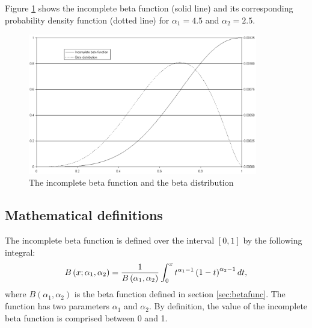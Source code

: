 Figure \ref{fig:incBetaFunction} shows the incomplete beta
function (solid line) and its corresponding probability density
function (dotted line) for $\alpha_1=4.5$ and $\alpha_2=2.5$.
\begin{figure}
\centering\includegraphics[width=10cm]{Figures/IncompleteBetaFunction}
\caption{The incomplete beta function and the beta distribution}\label{fig:incBetaFunction}
\end{figure}

\subsection{Mathematical definitions}
The incomplete beta function is defined over the interval
$\left[0,1\right]$ by the following integral:
\begin{equation}
\label{eq:incBetaFunction}
  B\left(x;\alpha_1,\alpha_2\right)={1\over B\left(\alpha_1,\alpha_2\right)}
  \int_0^x t^{\alpha_1-1}\left(1-t\right)^{\alpha_2-1}dt,
\end{equation}
where $B\left(\alpha_1,\alpha_2\right)$ is the beta function
defined in section \ref{sec:betafunc}. The function has two
parameters $\alpha_1$ and $\alpha_2$. By definition, the value of
the incomplete beta function is comprised between 0 and 1.

